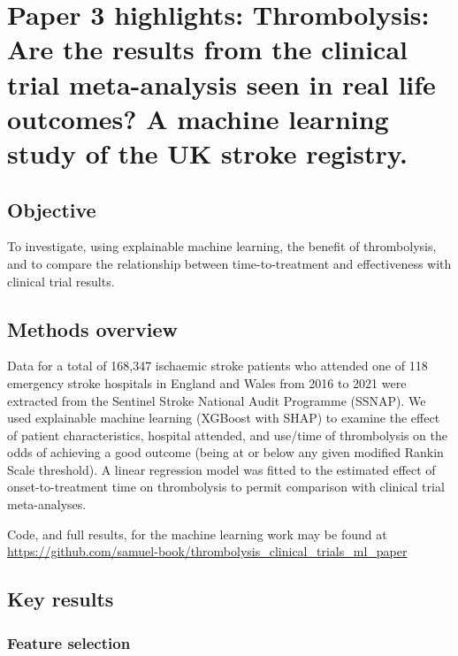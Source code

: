 
\section{Paper 3 highlights: Thrombolysis: Are the results from the clinical trial meta-analysis seen in real life outcomes?  A machine learning study of the UK stroke registry.\cite{pearn_thrombolysis_2024}}\label{sec:paper_3}

\subsection{Objective}

To investigate, using explainable machine learning, the benefit of thrombolysis, and to compare the relationship between time-to-treatment and effectiveness with clinical trial results.

\subsection{Methods overview}

Data for a total of 168,347 ischaemic stroke patients who attended one of 118 emergency stroke hospitals in England and Wales from 2016 to 2021 were extracted from the Sentinel Stroke National Audit Programme (SSNAP). We used explainable machine learning (XGBoost\cite{chen_xgboost_2016} with SHAP\cite{lundberg_unified_2017}) to examine the effect of patient characteristics, hospital attended, and use/time of thrombolysis on the odds of achieving a good outcome (being at or below any given modified Rankin Scale threshold). A linear regression model was fitted to the estimated effect of onset-to-treatment time on thrombolysis to permit comparison with clinical trial meta-analyses.

Code, and full results, for the machine learning work may be found at \url{https://github.com/samuel-book/thrombolysis_clinical_trials_ml_paper}

\subsection{Key results}

\subsubsection{Feature selection}


